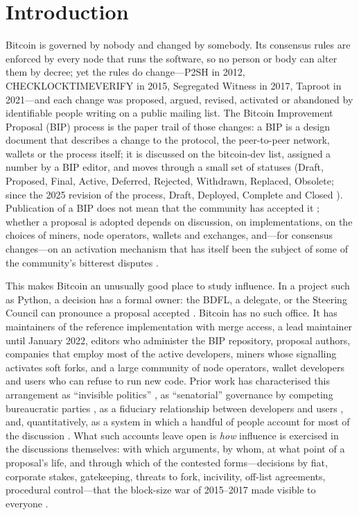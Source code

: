\section{Introduction}

Bitcoin is governed by nobody and changed by somebody. Its consensus rules are enforced by every node that runs the software, so no person or body can alter them by decree; yet the rules do change---P2SH in 2012, CHECKLOCKTIMEVERIFY in 2015, Segregated Witness in 2017, Taproot in 2021---and each change was proposed, argued, revised, activated or abandoned by identifiable people writing on a public mailing list. The Bitcoin Improvement Proposal (BIP) process \cite{bip2} is the paper trail of those changes: a BIP is a design document that describes a change to the protocol, the peer-to-peer network, wallets or the process itself; it is discussed on the bitcoin-dev list, assigned a number by a BIP editor, and moves through a small set of statuses (Draft, Proposed, Final, Active, Deferred, Rejected, Withdrawn, Replaced, Obsolete; since the 2025 revision of the process, Draft, Deployed, Complete and Closed \cite{bip2}). Publication of a BIP does not mean that the community has accepted it \cite{bitcoinbips}; whether a proposal is adopted depends on discussion, on implementations, on the choices of miners, node operators, wallets and exchanges, and---for consensus changes---on an activation mechanism that has itself been the subject of some of the community's bitterest disputes \cite{bip8, bip148}.

This makes Bitcoin an unusually good place to study influence. In a project such as Python, a decision has a formal owner: the BDFL, a delegate, or the Steering Council can pronounce a proposal accepted \cite{pep1, pep13}. Bitcoin has no such office. It has maintainers of the reference implementation with merge access, a lead maintainer until January 2022, editors who administer the BIP repository, proposal authors, companies that employ most of the active developers, miners whose signalling activates soft forks, and a large community of node operators, wallet developers and users who can refuse to run new code. Prior work has characterised this arrangement as ``invisible politics'' \cite{defilippi2016}, as ``senatorial'' governance by competing bureaucratic parties \cite{parkin2019}, as a fiduciary relationship between developers and users \cite{walch2019}, and, quantitatively, as a system in which a handful of people account for most of the discussion \cite{azouvi2018}. What such accounts leave open is \emph{how} influence is exercised in the discussions themselves: with which arguments, by whom, at what point of a proposal's life, and through which of the contested forms---decisions by fiat, corporate stakes, gatekeeping, threats to fork, incivility, off-list agreements, procedural control---that the block-size war of 2015--2017 made visible to everyone \cite{bier2021}.

